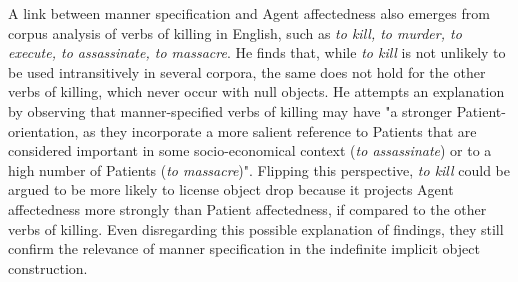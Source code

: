 A link between manner specification and Agent affectedness also emerges from  corpus analysis of verbs of killing in English, such as \textit{to kill, to murder, to execute, to assassinate, to massacre}. He finds that, while \textit{to kill} is not unlikely to be used intransitively in several corpora, the same does not hold for the other verbs of killing, which never occur with null objects. He attempts an explanation by observing that manner-specified verbs of killing may have "a stronger Patient-orientation, as they incorporate a more salient reference to Patients that are considered important in some socio-economical context (\textit{to assassinate}) or to a high number of Patients (\textit{to massacre})". Flipping this perspective, \textit{to kill} could be argued to be more likely to license object drop because it projects Agent affectedness more strongly than Patient affectedness, if compared to the other verbs of killing. Even disregarding this possible explanation of  findings, they still confirm the relevance of manner specification in the indefinite implicit object construction.

